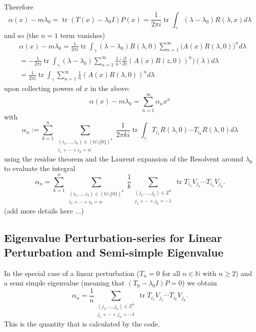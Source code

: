 \documentclass[11pt]{article}
\DeclareMathOperator{\tr}{tr}
\begin{document}
Therefore
\begin{equation}
    \alpha (x) -  m \lambda_0 = \tr (T(x) - \lambda_0 I ) P(x)
    = \frac{1}{2\pi i} \tr \int_\gamma (\lambda - \lambda_0 ) R(\lambda, x) d\lambda
\end{equation}
and so (the $n=1$ term vanishes)
\begin{equation}
    \begin{split}
        &\alpha (x) -  m \lambda_0 
        = \frac{1}{2\pi i} \tr \int_\gamma (\lambda - \lambda_0 )  R(\lambda,0)  \sum_{n=1}^\infty  (A(x) R(\lambda,0) \big)^n d\lambda \\
        &= -\frac{1}{2\pi i} \tr \int_\gamma (\lambda - \lambda_0) \sum_{n=1}^\infty \frac{1}{n}
        \bigg(\frac{\partial }{ \partial z}  (A(x) R(z,0))^n \bigg) (\lambda) d \lambda  \\
        &= \frac{1}{2\pi i} \tr \int_\gamma  \sum_{n=1}^\infty \frac{1}{n}
         (A(x) R(\lambda,0))^n  d \lambda
    \end{split}
\end{equation}
upon collecting powers of $x$ in the above:
\begin{equation}
    \alpha (x) - m \lambda_0 = \sum_{n=1}^\infty \alpha_n x^n
\end{equation}
with
\begin{equation}
    \alpha_n := \sum_{k=1}^n  \sum_{ \substack{(i_1, \dots, i_k) \in (\mathbb{N} \setminus \{0\})^k \\ i_1 + \cdots + i_k = n}}
    \frac{1}{2 \pi k i} \tr \int_\gamma T_{i_1} R(\lambda, 0)  \cdots  T_{i_k} R(\lambda, 0) d \lambda
\end{equation}
using the residue theorem and the Laurent expansion of the Resolvent around $\lambda_0$ to evaluate the integral
\begin{equation}
    \alpha_n =\sum_{k=1}^n 
    \sum_{ \substack{(i_1, \dots, i_k) \in (\mathbb{N} \setminus \{0\})^k \\ i_1 + \cdots + i_k = n}}
    \frac{1}{k} \sum_{\substack{(j_1, \dots, j_k) \in \mathbb{Z}^k\\ j_1 + \cdots + j_k = -1 }}
    \tr T_{i_1} V_{j_1} \cdots T_{i_k} V_{j_k} .
\end{equation}
(add more details here ...)
\subsection{Eigenvalue Perturbation-series for Linear Perturbation and Semi-simple Eigenvalue}
In the special case of a linear perturbation ($T_n =0$ for all $n \in \mathbb{N}$ with $n\geq2$)
and a semi simple eigenvalue (meaning that $(T_0- \lambda_0 I) P =0$)
we obtain 
\begin{equation}
    \alpha_n= \frac{1}{n} \sum_{ \substack{(j_1, \dots, j_n) \in \mathbb{Z}^n \\ j_1 + \cdots + j_n = -1}}
    \tr T_{i_1} V_{j_1} \cdots T_{i_k} V_{j_k}.
\end{equation}
This is the quantity that is calculated by the code.
\end{document}
